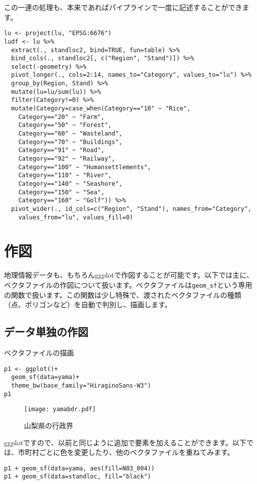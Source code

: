 この一連の処理も、本来であればパイプラインで一度に記述することができます。
\begin{verbatim}
lu <- project(lu, "EPSG:6676")
ludf <- lu %>%
  extract(., standloc2, bind=TRUE, fun=table) %>%
  bind_cols(., standloc2[, c("Region", "Stand")]) %>%
  select(-geometry) %>%
  pivot_longer(., cols=2:14, names_to="Category", values_to="lu") %>%
  group_by(Region, Stand) %>%
  mutate(lu=lu/sum(lu)) %>%
  filter(Category!=0) %>%
  mutate(Category=case_when(Category=="10" ~ "Rice",
    Category=="20" ~ "Farm",
    Category=="50" ~ "Forest",
    Category=="60" ~ "Wasteland",
    Category=="70" ~ "Buildings",
    Category=="91" ~ "Road",
    Category=="92" ~ "Railway",
    Category=="100" ~ "Humansettlements",
    Category=="110" ~ "River",
    Category=="140" ~ "Seashore",
    Category=="150" ~ "Sea",
    Category=="160" ~ "Golf")) %>%
  pivot_wider(., id_cols=c("Region", "Stand"), names_from="Category",
    values_from="lu", values_fill=0)
\end{verbatim}

\section{作図}
地理情報データも、もちろんggplotで作図することが可能です。以下では主に、ベクタファイルの作図について扱います。ベクタファイルは\verb|geom_sf|という専用の関数で扱います。この関数は少し特殊で、渡されたベクタファイルの種類（点、ポリゴンなど）を自動で判別し、描画します。
  \subsection{データ単独の作図}
\begin{itembox}[l]{ベクタファイルの描画}
\begin{verbatim}
p1 <- ggplot()+
  geom_sf(data=yama)+
  theme_bw(base_family="HiraginoSans-W3")
p1
\end{verbatim}
\end{itembox}
\begin{figure}[htb]
\begin{center}
\graphicspath{{2_gis/figs/}}
\texttt{[image: yamabdr.pdf]}\\
\caption{山梨県の行政界}
\label{yamabdr}
\end{center}
\end{figure}

ggplotですので、以前と同じように追加で要素を加えることができます。以下では、市町村ごとに色を変更したり、他のベクタファイルを重ねてみます。
\begin{verbatim}
p1 + geom_sf(data=yama, aes(fill=N03_004))
p1 + geom_sf(data=standloc, fill="black")
\end{verbatim}  

